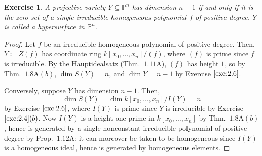 \documentclass[12pt,letterpaper]{article}
\newtheorem{problem}{Exercise}[section]
\theoremstyle{definition}
\theoremstyle{remark}
\numberwithin{equation}{section}
\numberwithin{figure}{problem}
\let\AA\relax
\DeclareMathOperator{\AA}{\mathbb{A}}
\newcommand{\PP}{\mathbb{P}}
\begin{document}
\begin{problem} A projective variety $Y \subseteq \PP^n$ has dimension $n-1$ if
  and only if it is the zero set of a single irreducible homogeneous polynomial
  $f$ of positive degree. $Y$ is called a \emph{hypersurface} in $\PP^n$. 
\end{problem}
\begin{proof}
  Let $f$ be an irreducible homogeneous polynomial of positive degree. Then,
  $Y \coloneqq Z(f)$ has coordinate ring $k[x_0,\ldots,x_n]/(f)$, where $(f)$ is
  prime since $f$ is irreducible. By the Hauptidealsatz (Thm.~$1.11$A), $(f)$ has
  height $1$, so by Thm.~$1.8$A$(b)$, $\dim S(Y) = n$, and $\dim Y = n-1$ by
  Exercise $\ref{exc:2.6}$.
  \par Conversely, suppose $Y$ has dimension $n-1$. Then,
  \[ \dim S(Y) = \dim k[x_0,\ldots,x_n]/I(Y) = n\]
  by Exercise $\ref{exc:2.6}$, where $I(Y)$ is
  prime since $Y$ is irreducible by Exercise $\ref{exc:2.4}(b)$. Now $I(Y)$ is a
  height one prime in $k[x_0,\ldots,x_n]$ by Thm.~$1.8$A$(b)$, hence is
  generated by a single nonconstant irreducible polynomial of positive degree
  by Prop.~$1.12$A; it can moreover be taken to be homogeneous since $I(Y)$ is a
  homogeneous ideal, hence is generated by homogeneous elements.
\end{proof}
\end{document}
